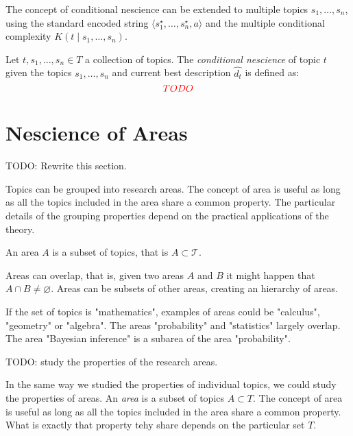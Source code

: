 The concept of conditional nescience can be extended to multiple topics $s_1, \ldots, s_n$, using the standard encoded string $\langle s_1^\star, \ldots, s_n^\star, a \rangle$ and the multiple conditional complexity $K (t \mid s_1, \ldots, s_n)$.

\begin{definition}
Let $t, s_1, \ldots, s_n \in T$ a collection of topics. The \emph{conditional nescience} of topic $t$ given the topics $s_1, \ldots, s_n$ and current best description $\hat{d_t}$ is defined as: 
\[
{\color{red} TODO}
\]
\end{definition}

%
%

\section{Nescience of Areas}
\label{sec:nescience_areas}

{\color{red} TODO: Rewrite this section.}

Topics can be grouped into research areas. The concept of area is useful as long as all the topics included in the area share a common property. The particular details of the grouping properties depend on the practical applications of the theory.

\begin{definition}
An area $A$ is a subset of topics, that is $A \subset \mathcal{T}$.
\end{definition}

Areas can overlap, that is, given two areas $A$ and $B$ it might happen that $A \cap B \neq \varnothing$. Areas can be subsets of other areas, creating an hierarchy of areas.

\begin{example}
If the set of topics is "mathematics", examples of areas could be "calculus", "geometry" or "algebra". The areas "probability" and "statistics" largely overlap. The area "Bayesian inference" is a subarea of the area "probability".
\end{example}

{\color{red} TODO: study the properties of the research areas.}

In the same way we studied the properties of individual topics, we could study the properties of areas. An \emph{area} is a subset of topics $A\subset T$. The concept of area is useful as long as all the topics included in the area share a common property. What is exactly that property tehy share depends on the particular set $T$.

